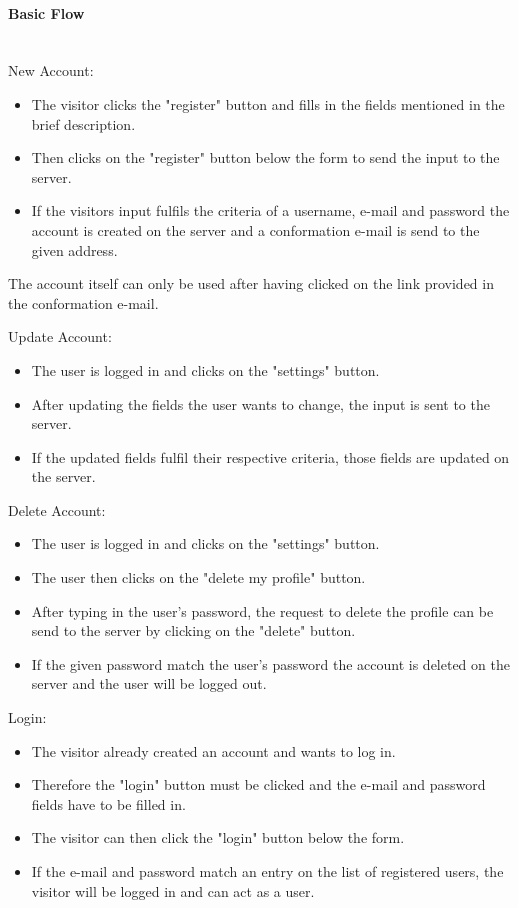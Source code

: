 \paragraph*{Basic Flow} \mbox{}\\
\noindent
New Account:
\begin{itemize}
	\vspace{-3mm}
	\setlength\itemsep{-1em}
	
	\item The visitor clicks the "register" button and fills in the fields mentioned in the brief description.
	\item Then clicks on the "register" button below the form to send the input to the server.
	\item If the visitors input fulfils the criteria of a username, e-mail and password the account is created on the server and a conformation e-mail is send to the given address.
\end{itemize}
The account itself can only be used after having clicked on the link provided in the conformation e-mail.

\noindent
Update Account: 
\begin{itemize}
	\vspace{-3mm}
	\setlength\itemsep{-1em}
	\item The user is logged in and clicks on the "settings" button.
	\item After updating the fields the user wants to change, the input is sent to the server.
	\item If the updated fields fulfil their respective criteria, those fields are updated on the server.
\end{itemize} 

\noindent
Delete Account:
\begin{itemize}
	\vspace{-3mm}
	\setlength\itemsep{-1em}
	\item The user is logged in and clicks on the "settings" button.
	\item The user then clicks on the "delete my profile" button. 
	\item After typing in the user's password, the request to delete the profile can be send to the server by clicking on the "delete" button.
	\item If the given password match the user's password the account is deleted on the server and the user will be logged out.
\end{itemize}

\noindent
Login:
\begin{itemize}
	\vspace{-3mm}
	\setlength\itemsep{-1em}
	\item The visitor already created an account and wants to log in.
	\item Therefore the "login" button must be clicked and the e-mail and password fields have to be filled in.
	\item The visitor can then click the "login" button below the form.
	\item If the e-mail and password match an entry on the list of registered users, the visitor will be logged in and can act as a user.
\end{itemize}

